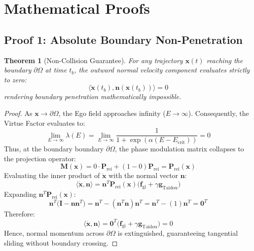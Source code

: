 \documentclass[11pt,a4paper]{article}
\newtheorem{theorem}{Theorem}
\begin{document}
\hr

\section{Mathematical Proofs}

\subsection{Proof 1: Absolute Boundary Non-Penetration}

\begin{theorem}[Non-Collision Guarantee]
For any trajectory $\mathbf{x}(t)$ reaching the boundary $\partial\Omega$ at time $t_b$, the outward normal velocity component evaluates strictly to zero:
\begin{equation}
\langle \dot{\mathbf{x}}(t_b), \mathbf{n}(\mathbf{x}(t_b)) \rangle = 0
\end{equation}
rendering boundary penetration mathematically impossible.
\end{theorem}

\begin{proof}
As $\mathbf{x} \to \partial\Omega$, the Ego field approaches infinity ($E \to \infty$). Consequently, the Virtue Factor evaluates to:
\begin{equation}
\lim_{E \to \infty} \lambda(E) = \lim_{E \to \infty} \frac{1}{1 + \exp(\alpha(E - E_{\text{crit}}))} = 0
\end{equation}
Thus, at the boundary boundary $\partial\Omega$, the phase modulation matrix collapses to the projection operator:
\begin{equation}
\mathbf{M}(\mathbf{x}) = 0 \cdot \mathbf{P}_{\text{rei}} + (1 - 0)\mathbf{P}_{\text{rei}} = \mathbf{P}_{\text{rei}}(\mathbf{x})
\end{equation}
Evaluating the inner product of $\dot{\mathbf{x}}$ with the normal vector $\mathbf{n}$:
\begin{equation}
\langle \dot{\mathbf{x}}, \mathbf{n} \rangle = \mathbf{n}^T \mathbf{P}_{\text{rei}}(\mathbf{x}) \Big( \mathbf{f}_{\text{gi}} + \gamma \mathbf{g}_{\text{Taidou}} \Big)
\end{equation}
Expanding $\mathbf{n}^T \mathbf{P}_{\text{rei}}(\mathbf{x})$:
\begin{equation}
\mathbf{n}^T \Big( \mathbf{I} - \mathbf{n}\mathbf{n}^T \Big) = \mathbf{n}^T - (\mathbf{n}^T \mathbf{n})\mathbf{n}^T = \mathbf{n}^T - (1)\mathbf{n}^T = \mathbf{0}^T
\end{equation}
Therefore:
\begin{equation}
\langle \dot{\mathbf{x}}, \mathbf{n} \rangle = \mathbf{0}^T \Big( \mathbf{f}_{\text{gi}} + \gamma \mathbf{g}_{\text{Taidou}} \Big) = 0
\end{equation}
Hence, normal momentum across $\partial\Omega$ is extinguished, guaranteeing tangential sliding without boundary crossing.
\end{proof}
\end{document}
